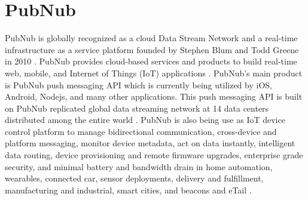 \section{PubNub}

PubNub is globally recognized as a cloud Data Stream Network and a real-time
infrastructure as a service platform founded by Stephen Blum and Todd Greene in
2010 \cite{ hid-sp18-409-www-pubnub}. PubNub provides cloud-based services and
products to build real-time web, mobile, and Internet of Things (IoT)
applications \cite{ hid-sp18-409-www-pubnub-wikipedia}. PubNub's main product is
PubNub push messaging API which is currently being utilized by iOS, Android,
Nodejs, and many other applications.  This push messaging API is built on PubNub
replicated global data streaming network at 14 data centers distributed among
the entire world \cite{hid-sp18-409-www-pubnub-wikipedia}.  PubNub is also being
use as IoT device control platform to manage bidirectional communication,
cross-device and platform messaging, monitor device metadata, act on data
instantly, intelligent data routing, device provisioning and remote firmware
upgrades, enterprise grade security, and minimal battery and bandwidth drain in
home automation, wearables, connected car, sensor deployments, delivery and
fulfillment, manufacturing and industrial, smart cities, and beacons and eTail
\cite{hid-sp18-409-www-pubnub}.

